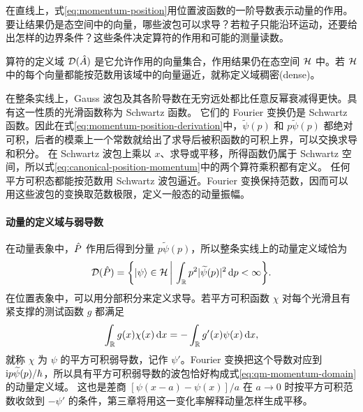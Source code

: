 \label{sec:selfadjoint}
在直线上，式\eqref{eq:momentum-position}用位置波函数的一阶导数表示动量的作用。要让结果仍是态空间中的向量，哪些波包可以求导？若粒子只能沿环运动，还要给出怎样的边界条件？这些条件决定算符的作用和可能的测量读数。

\label{ss:qm-regularity}
算符的定义域 $\mathcal D(\hat{A})$ 是它允许作用的向量集合，作用结果仍在态空间 $\mathcal H$ 中。若 $\mathcal H$ 中的每个向量都能按范数用该域中的向量逼近，就称定义域稠密(dense)。

在整条实线上，Gauss 波包及其各阶导数在无穷远处都比任意反幂衰减得更快。具有这一性质的光滑函数称为 Schwartz 函数。
它们的 Fourier 变换仍是 Schwartz 函数。因此在式\eqref{eq:momentum-position-derivation}中，$\widetilde\psi(p)$ 和 $p\widetilde\psi(p)$ 都绝对可积，后者的模乘上一个常数就给出了求导后被积函数的可积上界，可以交换求导和积分。
在 Schwartz 波包上乘以 $x$、求导或平移，所得函数仍属于 Schwartz 空间，所以式\eqref{eq:canonical-position-momentum}中的两个算符乘积都有定义。
任何平方可积态都能按范数用 Schwartz 波包逼近。Fourier 变换保持范数，因而可以用这些波包的变换取范数极限，定义一般态的动量振幅。

\paragraph{动量的定义域与弱导数}
在动量表象中，$\hat{P}$ 作用后得到分量 $p\widetilde\psi(p)$，所以整条实线上的动量定义域恰为
\begin{equation}\label{eq:qm-momentum-domain}
    \mathcal D(\hat{P}) = \biggl\{\lvert\psi\rangle \in \mathcal H\,\bigg\vert\,\int_{\mathbb{R}}p^2\lvert\widetilde\psi(p)\rvert^2\mathop{}\!\mathrm{d} p < \infty\biggr\}.
\end{equation}
在位置表象中，可以用分部积分来定义求导。若平方可积函数 $\chi$ 对每个光滑且有紧支撑的测试函数 $g$ 都满足
\begin{equation}\label{eq:qm-weak-spatial-derivative}
    \int_{\mathbb{R}} g(x)\chi(x)\mathop{}\!\mathrm{d} x = -\int_{\mathbb{R}}g'(x)\psi(x)\mathop{}\!\mathrm{d} x ,
\end{equation}
就称 $\chi$ 为 $\psi$ 的平方可积弱导数，记作 $\psi'$。Fourier 变换把这个导数对应到 $\mathrm{i} p\widetilde\psi(p)/\hbar$，所以具有平方可积弱导数的波包恰好构成式\eqref{eq:qm-momentum-domain}的动量定义域。
这也是差商 $[\psi(x-a)-\psi(x)]/a$ 在 $a \to 0$ 时按平方可积范数收敛到 $-\psi'$ 的条件，第三章将用这一变化率解释动量怎样生成平移。


